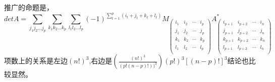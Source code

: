 \documentclass[twoside,a4paper,CCT]{cctart}   %
\begin{document}
推广的命题是，
$$detA=\sum\limits_{j_{1}j_{2}...j_{p}} \sum\limits_{k_{1}k_{2}...k_{p}} \sum\limits_{l_{1}l_{2}...l_{p}}
(-1)^{\sum_{t=1}^{p}(i_{t}+j_{t}+k_{t}+l_{t})}
M_{\left(\begin{array}{cccc}
i_{1} & i_{2} & \cdots & i_{p} \\
j_{1} & j_{2} & \cdots & j_{p} \\
k_{1} & k_{2} & \cdots & k_{p} \\
l_{1} & l_{2} & \cdots & l_{p} \\
\end{array}\right)}
A^{*}_{\left(\begin{array}{cccc}
i_{p+1} & i_{p+2} & \cdots & i_{n} \\
j_{p+1} & j_{p+2} & \cdots & j_{n} \\
k_{p+1} & k_{p+2} & \cdots & k_{n} \\
l_{p+1} & l_{p+2} & \cdots & l_{n} \\
\end{array}\right)}$$
项数上的关系是左边$(n!)^{3}$,右边是$(\frac{(n!)^{3}}{(p!(n-p)!))^{3}})(p!)^{3}[(n-p)!]^{3}$结论也比较显然。
\end{document}

